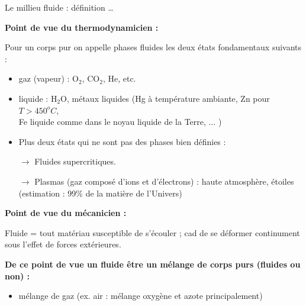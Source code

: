 \begin{frame}{Le millieu fluide : définition \ldots}

\small

\textbf{Point de vue du thermodynamicien :} \bigskip

Pour un corps pur on appelle phases fluides les deux états fondamentaux suivants : 

\pause

\medskip

\begin{itemize}[<+-| alert@+>]
\item
	gaz (vapeur) : \textrm{O$_2$}, \textrm{CO$_2$}, \textrm{He}, etc.
\item
	liquide : \textrm{H$_2$O}, métaux liquides (\textrm{Hg} à température ambiante, 
	\textrm{Zn} pour $T>450^o C$, \\
	\textrm{Fe} liquide comme dans le noyau liquide de la Terre, ... )

\item Plus deux états qui ne sont pas des phases bien définies :
	
$\rightarrow$ 
Fluides supercritiques. 
	
$\rightarrow$
	Plasmas (gaz composé d'ions et d'électrons) : 
	haute atmosphère, étoiles (estimation : 99\% de la matière de l'Univers)

\end{itemize}


\pause


\textbf{Point de vue du mécanicien :} \bigskip

Fluide = tout matériau susceptible de s'écouler ; cad de se déformer continument sous l'effet de forces extérieures.




\textbf{
De ce point de vue un fluide être un mélange de corps purs (fluides ou non) :}

\pause

\medskip

\begin{itemize}[<+-| alert@+>]
\item
	mélange de gaz (ex. air : mélange oxygène et azote principalement)


\end{itemize}
\end{frame}
